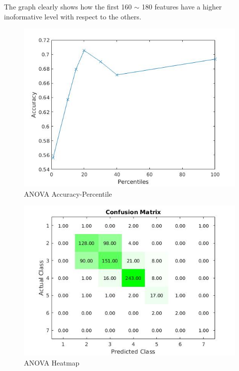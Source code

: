 \documentclass[a4paper,10pt]{article}
\begin{document}
      \noindent The graph clearly shows how the first 160 $\sim$ 180 features have a higher inoformative level with respect to the others.\newline
      
      \begin{figure}[H]
	\centering
	\includegraphics[scale=0.5]{anova-acc.jpg}
	\caption{ANOVA Accuracy-Percentile}
      \end{figure}
      
      \begin{figure}[H]
	\centering
	\includegraphics[scale=0.5]{anova-heat.jpg}
	\caption{ANOVA Heatmap}
      \end{figure}
      
\end{document}
